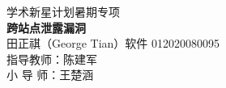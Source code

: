 \vspace*{\fill}
\begin{center}
    学术新星计划暑期专项\\
    \vspace{2em}
    \Huge
    \textbf{跨站点泄露漏洞}\\
    \normalsize
    \vspace{2em}
    田正祺（George Tian）\hspace{1em}软件 01\hspace{1em}2020080095\\
    \vspace{2em}
    指导教师：陈建军\\
    小 导 师：王楚涵\\
\end{center}
\vspace*{\fill}
\newpage
{}